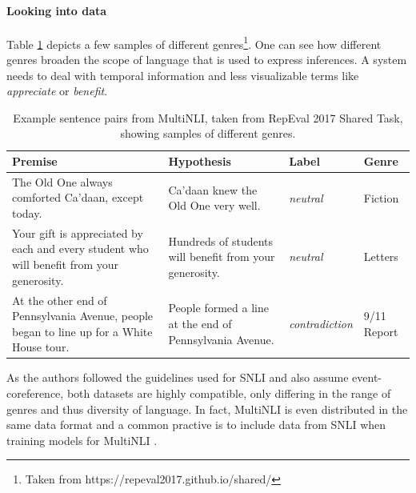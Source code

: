 \paragraph*{Looking into data}
Table \ref{table:multinli_example} depicts a few samples of different genres\footnote{Taken from https://repeval2017.github.io/shared/}. One can see how different genres broaden the scope of language that is used to express inferences. A system needs to deal with temporal information and less visualizable terms like \textit{appreciate} or \textit{benefit}.
\begin{center}
\begin{table}[h]
\begin{center}
\begin{tabular}{llll}
\textbf{Premise} & \textbf{Hypothesis} & \textbf{Label}  & \textbf{Genre} \\
\toprule
\multirow{3}{*}{\parbox{6cm}{The Old One always comforted Ca'daan, except today.}} & \multirow{3}{*}{\parbox{6cm}{Ca'daan knew the Old One very well.}} & & \\
& & \textit{neutral} & Fiction \\
& & & \\
\midrule
\multirow{3}{*}{\parbox{6cm}{Your gift is appreciated by each and every student who will benefit from your generosity.}} & \multirow{3}{*}{\parbox{6cm}{Hundreds of students will benefit from your generosity.}} & &\\
&  & \textit{neutral} & Letters \\
& & & \\
\midrule
\multirow{3}{*}{\parbox{6cm}{At the other end of Pennsylvania Avenue, people began to line up for a White House tour.}} & \multirow{3}{*}{\parbox{6cm}{People formed a line at the end of Pennsylvania Avenue.}} &  & \\
& & \textit{contradiction} & 9/11 Report \\
& & & \\

\bottomrule
\end{tabular}
\end{center}
\caption{Example sentence pairs from \ac{MultiNLI}, taken from RepEval 2017 Shared Task, showing samples of different genres.}
\label{table:multinli_example}
\end{table}
\end{center}

As the authors followed the guidelines used for \ac{SNLI} and also assume event-coreference, both datasets are highly compatible, only differing in the range of genres and thus diversity of language. In fact, \ac{MultiNLI} is even distributed in the same data format and a common practive is to include data from \ac{SNLI} when training models for \ac{MultiNLI} \citep{nie2017shortcut,balazs2017refining,yang2017character}.

